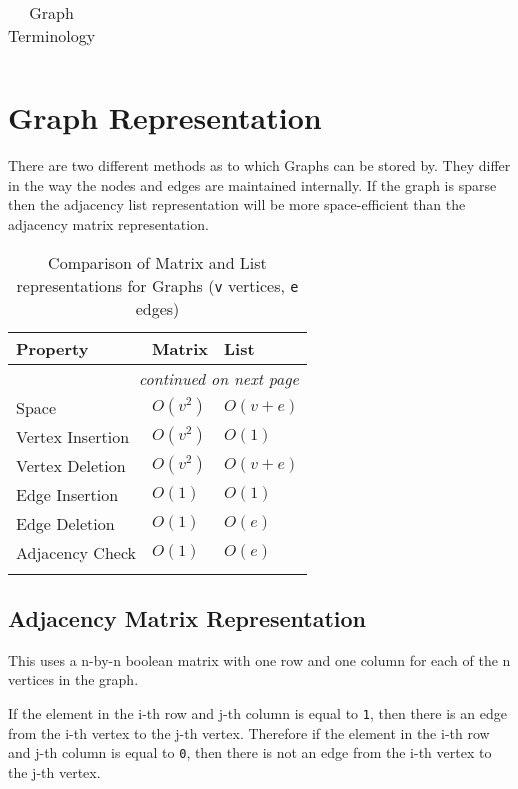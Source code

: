 {\begin{longtable}{p{} p{}}
    \caption{Graph Terminology}
    \end{longtable}
} %

\section{Graph Representation}
There are two different methods as to which Graphs can be stored by. They differ in the way the nodes and edges are maintained internally. If the graph is sparse then the adjacency list representation will be more space-efficient than the adjacency matrix representation. 

{\RaggedRight \centering
    \begin{longtable}{p{} p{} p{}}
    \textbf{Property} & \textbf{Matrix} & \textbf{List}\\
    \hline
    \hline
    \endhead

    \multicolumn{3}{r}{\footnotesize\itshape continued on next page}\\
    \endfoot 

    \endlastfoot

    Space & $O(v^2)$ & $O(v+e)$\\
    \hline
    Vertex Insertion & $O(v^2)$ & $O(1)$\\
    \hline
    Vertex Deletion & $O(v^2)$ & $O(v+e)$\\
    \hline
    Edge Insertion & $O(1)$ & $O(1)$\\
    \hline
    Edge Deletion & $O(1)$ & $O(e)$\\
    \hline
    Adjacency Check & $O(1)$ & $O(e)$\\
    \hline
    
    \caption{Comparison of Matrix and List representations for Graphs (\texttt{v} vertices, \texttt{e} edges)}
    \end{longtable}
} %

\subsection{Adjacency Matrix Representation}
This uses a n-by-n boolean matrix with one row and one column for each of the n vertices in the graph.

If the element in the i-th row and j-th column is equal to \verb|1|, then there is an edge from the i-th vertex to the j-th vertex. Therefore if the element in the i-th row and j-th column is equal to \verb|0|, then there is not an edge from the i-th vertex to the j-th vertex.


